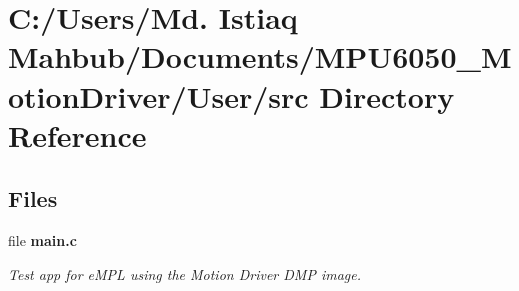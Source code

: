 \section{C\+:/\+Users/\+Md. Istiaq Mahbub/\+Documents/\+M\+P\+U6050\+\_\+\+Motion\+Driver/\+User/src Directory Reference}
\label{dir_87b1502dc85a10aeb126e82241a9d9a4}
\subsection*{Files}
\begin{DoxyCompactItemize}
\item 
file \textbf{ main.\+c}
\begin{DoxyCompactList}\small\item\em Test app for e\+M\+PL using the Motion Driver D\+MP image. \end{DoxyCompactList}\end{DoxyCompactItemize}
